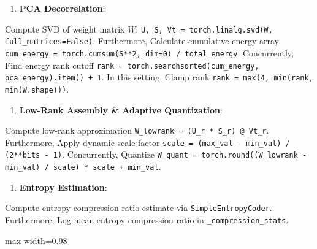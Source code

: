 \begin{enumerate}
\item \textbf{PCA Decorrelation}:
\end{enumerate}
Compute SVD of weight matrix $W$: \texttt{U, S, Vt = torch.linalg.svd(W, full\_matrices=False)}. Furthermore, Calculate cumulative energy array \texttt{cum\_energy = torch.cumsum(S**2, dim=0) / total\_energy}. Concurrently, Find energy rank cutoff \texttt{rank = torch.searchsorted(cum\_energy, pca\_energy).item() + 1}. In this setting, Clamp rank \texttt{rank = max(4, min(rank, min(W.shape)))}.

\begin{enumerate}
\item \textbf{Low-Rank Assembly \& Adaptive Quantization}:
\end{enumerate}
Compute low-rank approximation \texttt{W\_lowrank = (U\_r * S\_r) @ Vt\_r}. Furthermore, Apply dynamic scale factor \texttt{scale = (max\_val - min\_val) / (2**bits - 1)}. Concurrently, Quantize \texttt{W\_quant = torch.round((W\_lowrank - min\_val) / scale) * scale + min\_val}.

\begin{enumerate}
\item \textbf{Entropy Estimation}:
\end{enumerate}
Compute entropy compression ratio estimate via \texttt{SimpleEntropyCoder}. Furthermore, Log mean entropy compression ratio in \texttt{\_compression\_stats}.


\begin{center}
\begin{adjustbox}{max width=0.98\columnwidth}
\end{adjustbox}
\end{center}


